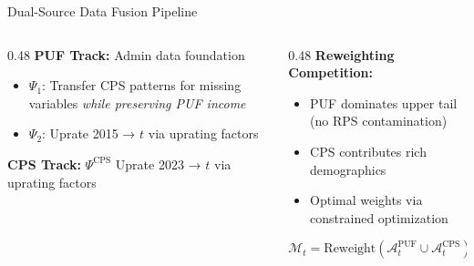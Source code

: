 \documentclass[11pt,aspectratio=169]{beamer}
\begin{document}
\begin{frame}{Dual-Source Data Fusion Pipeline}
\vspace{0.1cm}

\begin{columns}
\begin{column}{0.48\textwidth}
\textbf{PUF Track:} Admin data foundation
\begin{itemize}
    \item $\Psi_1$: Transfer CPS patterns for missing variables \textit{while preserving PUF income}
    \item $\Psi_2$: Uprate 2015 → $t$ via uprating factors 
\end{itemize}

\textbf{CPS Track:} $\Psi^{\text{CPS}}$ Uprate 2023 → $t$ via uprating factors
\end{column}

\begin{column}{0.48\textwidth}
\textbf{Reweighting Competition:}
\begin{itemize}
    \item PUF dominates upper tail (no RPS contamination)
    \item CPS contributes rich demographics
    \item Optimal weights via constrained optimization
\end{itemize}
$$\mathcal{M}_t = \text{Reweight}(\mathcal{A}_t^{\text{PUF}} \cup \mathcal{A}_t^{\text{CPS}})$$
\end{column}
\end{columns}
\end{frame}
\end{document}
